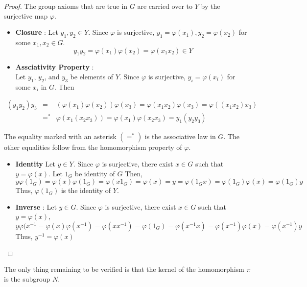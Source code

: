 \documentclass[
]{book}
\theoremstyle{definition}
\theoremstyle{definition}
\theoremstyle{definition}
\theoremstyle{definition}
\theoremstyle{remark}
\begin{document}
\begin{proof}

The group axioms that are true in \(G\) are carried over to \(Y\) by the surjective map \(\varphi\).

\begin{itemize}
\item
  \textbf{Closure} : Let \(y_1,y_2\in Y\). Since \(\varphi\) is surjective, \(y_1=\varphi(x_1),y_2=\varphi(x_2)\) for some \(x_1,x_2\in G\).
  \[y_1y_2=\varphi(x_1)\varphi(x_2)=\varphi(x_1x_2)\in Y\]
\item
  \textbf{Assciativity Property} :\\
  Let \(y_1\), \(y_2\), and \(y_3\) be elements of \(Y\). Since \(\varphi\) is surjective, \(y_i = \varphi(x_i)\) for some \(x_i\) in \(G\). Then
\end{itemize}

\begin{eqnarray}
(y_1 y_2) y_3 &=& (\varphi(x_1) \varphi(x_2)) \varphi(x_3) = \varphi(x_1 x_2) \varphi(x_3) = \varphi((x_1 x_2) x_3) \\
&=^*& \varphi(x_1 (x_2 x_3)) = \varphi(x_1) \varphi(x_2 x_3) = y_1 (y_2 y_3)
\end{eqnarray}

The equality marked with an asterisk \((=^*)\) is the associative law in \(G\). The other equalities follow from the homomorphism property of \(\varphi\).

\begin{itemize}
\item
  \textbf{Identity}
  Let \(y\in Y\). Since \(\varphi\) is surjective, there exist \(x\in G\) such that \(y=\varphi(x)\). Let \(1_G\) be identity of \(G\) Then,
  \[y\varphi(1_G)=\varphi(x)\varphi(1_G)=\varphi(x1_G)=\varphi(x)=y=
    \varphi(1_Gx)=\varphi(1_G)\varphi(x)=\varphi(1_G)y\]
  Thus, \(\varphi(1_G)\) is the identity of \(Y\).
\item
  \textbf{Inverse} : Let \(y\in G\). Since \(\varphi\) is surjective, there exist \(x\in G\) such that \(y=\varphi(x)\),
  \[y\varphi(x^{-1}=\varphi(x)\varphi(x^{-1})
           =\varphi(xx^{-1})=\varphi(1_G)=\varphi(x^{-1}x)=\varphi(x^{-1})\varphi(x)=\varphi(x^{-1})y\]
  Thus, \(y^{-1}=\varphi(x)\)
\end{itemize}

\end{proof}

The only thing remaining to be verified is that the kernel of the homomorphism \(\pi\) is the subgroup \(N\).
\end{document}
